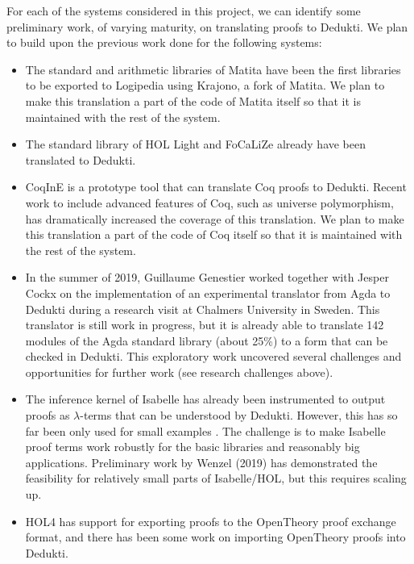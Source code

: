 \bigskip

For each of the systems considered in this project, we can identify
some preliminary work, of varying maturity, on translating proofs to
Dedukti.  We plan to build upon the previous work done for the
following systems:
\begin{itemize}
\item The standard and arithmetic libraries of Matita have been the
  first libraries to be exported to Logipedia using Krajono, a fork of
  Matita. We plan to make this translation a part of the code of
  Matita itself so that it is maintained with the rest of the system.

\item The standard library of HOL Light and FoCaLiZe already have been
  translated to Dedukti.

\item CoqInE is a prototype tool that can translate Coq proofs to
  Dedukti. Recent work to include advanced features of Coq, such as
  universe polymorphism, has dramatically increased the coverage of
  this translation. We plan to make this translation a part of the
  code of Coq itself so that it is maintained with the rest of the
  system.

\item In the summer of 2019, Guillaume Genestier worked together with
  Jesper Cockx on the implementation of an experimental translator
  from Agda to Dedukti during a research visit at Chalmers University
  in Sweden. This translator is still work in progress, but it is
  already able to translate 142 modules of the Agda standard library
  (about 25\%) to a form that can be checked in Dedukti. This
  exploratory work uncovered several challenges and opportunities for
  further work (see research challenges above).

\item The inference kernel of Isabelle has already been instrumented
  to output proofs as $\lambda$-terms that can be understood by
  Dedukti. However, this has so far been only used for small examples
  \cite{Berghofer-Nipkow:2000:TPHOL}. The challenge is to make
  Isabelle proof terms work robustly for the basic libraries and
  reasonably big applications.  Preliminary work by Wenzel (2019) has
  demonstrated the feasibility for relatively small parts of
  Isabelle/HOL, but this requires scaling up.

\item HOL4 has support for exporting proofs to the OpenTheory proof
  exchange format, and there has been some work on importing
  OpenTheory proofs into Dedukti.


\end{itemize}
